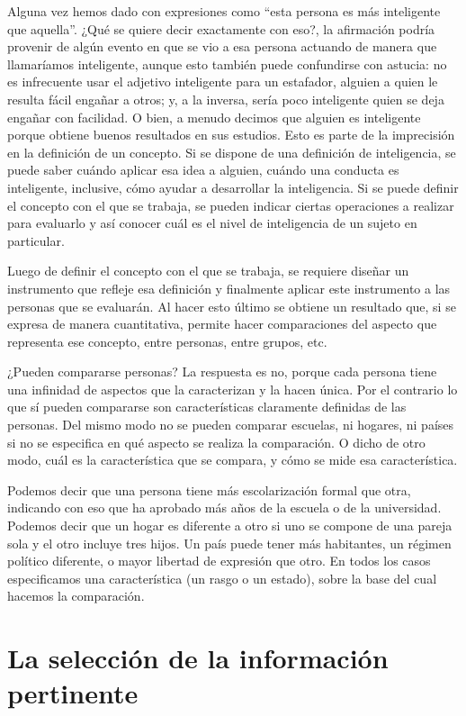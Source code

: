 \documentclass[]{book}
\begin{document}
Alguna vez hemos dado con expresiones como ``esta persona es más inteligente que aquella''. ¿Qué se quiere decir exactamente con eso?, la afirmación podría provenir de algún evento en que se vio a esa persona actuando de manera que llamaríamos inteligente, aunque esto también puede confundirse con astucia: no es infrecuente usar el adjetivo inteligente para un estafador, alguien a quien le resulta fácil engañar a otros; y, a la inversa, sería poco inteligente quien se deja engañar con facilidad. O bien, a menudo decimos que alguien es inteligente porque obtiene buenos resultados en sus estudios. Esto es parte de la imprecisión en la definición de un concepto. Si se dispone de una definición de inteligencia, se puede saber cuándo aplicar esa idea a alguien, cuándo una conducta es inteligente, inclusive, cómo ayudar a desarrollar la inteligencia. Si se puede definir el concepto con el que se trabaja, se pueden indicar ciertas operaciones a realizar para evaluarlo y así conocer cuál es el nivel de inteligencia de un sujeto en particular.

Luego de definir el concepto con el que se trabaja, se requiere diseñar un instrumento que refleje esa definición y finalmente aplicar este instrumento a las personas que se evaluarán. Al hacer esto último se obtiene un resultado que, si se expresa de manera cuantitativa, permite hacer comparaciones del aspecto que representa ese concepto, entre personas, entre grupos, etc.

¿Pueden compararse personas? La respuesta es no, porque cada persona tiene una infinidad de aspectos que la caracterizan y la hacen única. Por el contrario lo que sí pueden compararse son características claramente definidas de las personas. Del mismo modo no se pueden comparar escuelas, ni hogares, ni países si no se especifica en qué aspecto se realiza la comparación. O dicho de otro modo, cuál es la característica que se compara, y cómo se mide esa característica.

Podemos decir que una persona tiene más escolarización formal que otra, indicando con eso que ha aprobado más años de la escuela o de la universidad. Podemos decir que un hogar es diferente a otro si uno se compone de una pareja sola y el otro incluye tres hijos. Un país puede tener más habitantes, un régimen político diferente, o mayor libertad de expresión que otro. En todos los casos especificamos una característica (un rasgo o un estado), sobre la base del cual hacemos la comparación.

\hypertarget{la-selecciuxf3n-de-la-informaciuxf3n-pertinente}{%
\section{La selección de la información pertinente}\label{la-selecciuxf3n-de-la-informaciuxf3n-pertinente}}
\end{document}
